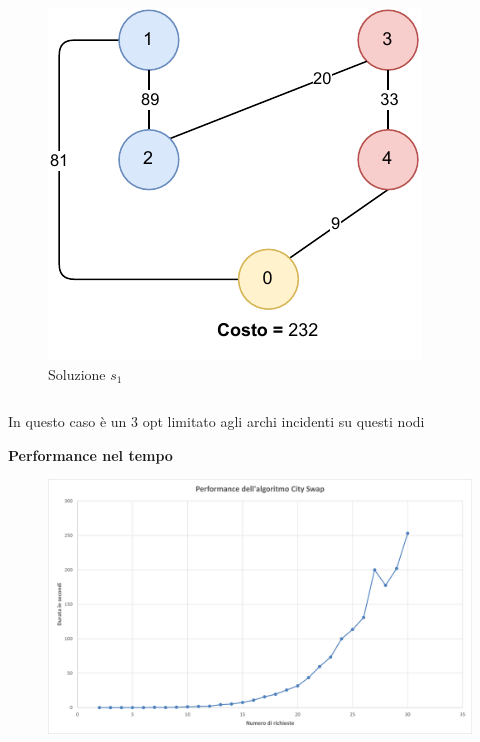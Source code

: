 \documentclass[9pt]{beamer}
\begin{document}
\begin{frame}{\subsecname}
{\begin{columns}[T,onlytextwidth]
\begin{figure}[h]
		\includegraphics[height=0.25\textheight]
		{../images/graph-greedy-pickup-first-solution-tsppd-with-two-customers}	
		\caption{Soluzione $s_1$}
		\end{figure}
	\end{columns}

	In questo caso è un 3 opt limitato agli archi incidenti su questi nodi
	}
\framebreak

	\textbf{Performance nel tempo}
      	\begin{figure}[h]
	\centering
	\includegraphics[width=\textwidth]
	{../charts/10 Performance dell'algoritmo City Swap}
	\end{figure}

\end{frame}
\end{document}
